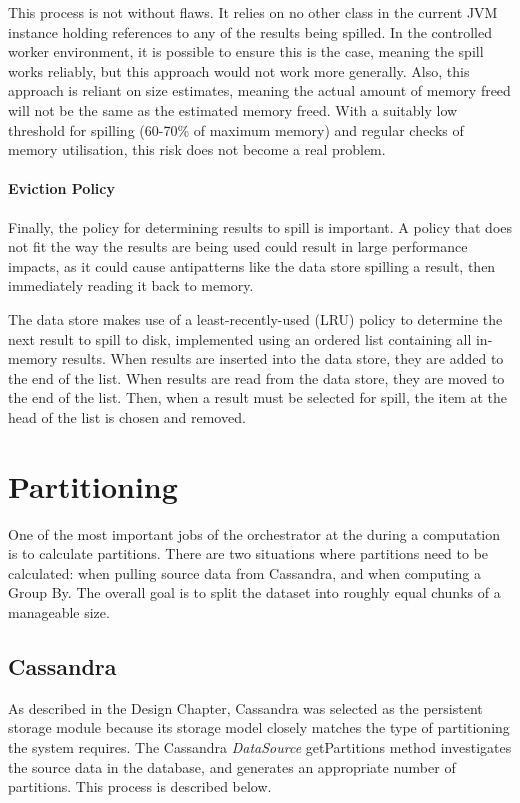 This process is not without flaws. It relies on no other class in the current JVM instance holding references to any of the results being spilled. In the controlled worker environment, it is possible to ensure this is the case, meaning the spill works reliably, but this approach would not work more generally. Also, this approach is reliant on size estimates, meaning the actual amount of memory freed will not be the same as the estimated memory freed. With a suitably low threshold for spilling (60-70\% of maximum memory) and regular checks of memory utilisation, this risk does not become a real problem.

\paragraph{Eviction Policy}
Finally, the policy for determining results to spill is important. A policy that does not fit the way the results are being used could result in large performance impacts, as it could cause antipatterns like the data store spilling a result, then immediately reading it back to memory.

The data store makes use of a least-recently-used (LRU) policy to determine the next result to spill to disk, implemented using an ordered list containing all in-memory results. When results are inserted into the data store, they are added to the end of the list. When results are read from the data store, they are moved to the end of the list. Then, when a result must be selected for spill, the item at the head of the list is chosen and removed.



\section{Partitioning}
One of the most important jobs of the orchestrator at the during a computation is to calculate partitions. There are two situations where partitions need to be calculated: when pulling source data from Cassandra, and when computing a Group By. The overall goal is to split the dataset into roughly equal chunks of a manageable size. 

\subsection{Cassandra}
As described in the Design Chapter, Cassandra was selected as the persistent storage module because its storage model closely matches the type of partitioning the system requires. The Cassandra \textit{DataSource} getPartitions method investigates the source data in the database, and generates an appropriate number of partitions. This process is described below.

